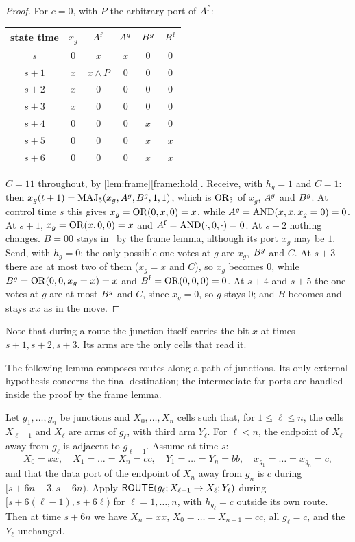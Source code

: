 \begin{proof}
For $c=0$, with $P$ the arbitrary port of $A^{\mathrm f}$:
\begin{center}\small
\begin{tabular}{cccccc}\toprule
state time & $x_g$ & $A^{\mathrm f}$ & $A^{g}$ & $B^{g}$ & $B^{\mathrm f}$\\\midrule
$s$   & $0$ & $x$ & $x$ & $0$ & $0$\\
$s+1$ & $x$ & $x\wedge P$ & $0$ & $0$ & $0$\\
$s+2$ & $x$ & $0$ & $0$ & $0$ & $0$\\
$s+3$ & $x$ & $0$ & $0$ & $0$ & $0$\\
$s+4$ & $0$ & $0$ & $0$ & $x$ & $0$\\
$s+5$ & $0$ & $0$ & $0$ & $x$ & $x$\\
$s+6$ & $0$ & $0$ & $0$ & $x$ & $x$\\\bottomrule
\end{tabular}
\end{center}
$C=11$ throughout, by \cref{lem:frame}\ref{frame:hold}.
Receive, with $h_g=1$ and $C=1$: then $x_g(t+1)=\operatorname{MAJ}_5(x_g,A^{g},B^{g},1,1)$, which is $\operatorname{OR}_3$ of
$x_g$, $A^{g}$ and $B^{g}$. At control time $s$ this gives $x_g=\operatorname{OR}(0,x,0)=x$, while
$A^{g}=\operatorname{AND}(x,x,x_g=0)=0$. At $s+1$, $x_g=\operatorname{OR}(x,0,0)=x$ and $A^{\mathrm f}=\operatorname{AND}(\cdot,0,\cdot)=0$.
At $s+2$ nothing changes. $B=00$ stays in \HOLD\ by the frame lemma, although its port $x_g$ may be
$1$.
Send, with $h_g=0$: the only possible one-votes at $g$ are $x_g$, $B^{g}$ and $C$. At $s+3$ there are
at most two of them ($x_g=x$ and $C$), so $x_g$ becomes $0$, while $B^{g}=\operatorname{OR}(0,0,x_g=x)=x$ and
$B^{\mathrm f}=\operatorname{OR}(0,0,0)=0$. At $s+4$ and $s+5$ the one-votes at $g$ are at most $B^{g}$ and $C$,
since $x_g=0$, so $g$ stays $0$; and $B$ becomes and stays $xx$ as in the move.
\end{proof}

Note that during a route the junction itself carries the bit $x$ at times $s+1,s+2,s+3$. Its arms
are the only cells that read it.

The following lemma composes routes along a path of junctions. Its only external hypothesis concerns
the final destination; the intermediate far ports are handled inside the proof by the frame lemma.

\begin{lemma}\label{lem:chain}
Let $g_1,\dots,g_n$ be junctions and $X_0,\dots,X_n$ cells such that, for $1\le\ell\le n$, the cells
$X_{\ell-1}$ and $X_\ell$ are arms of $g_\ell$, with third arm $Y_\ell$. For $\ell<n$, the endpoint
of $X_\ell$ away from $g_\ell$ is adjacent to $g_{\ell+1}$. Assume at time $s$:
\[
X_0=xx,\quad X_1=\dots=X_n=cc,\quad Y_1=\dots=Y_n=bb,\quad x_{g_1}=\dots=x_{g_n}=c,
\]
and that the data port of the endpoint of $X_n$ away from $g_n$ is $c$ during
$[s+6n-3,s+6n)$. Apply $\textsf{ROUTE}(g_\ell;X_{\ell-1}\to X_\ell;Y_\ell)$ during
$[s+6(\ell-1),s+6\ell)$ for $\ell=1,\dots,n$, with $h_{g_\ell}=c$ outside its own route. Then at
time $s+6n$ we have $X_n=xx$, $X_0=\dots=X_{n-1}=cc$, all $g_\ell=c$, and the $Y_\ell$ unchanged.
\end{lemma}

